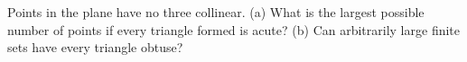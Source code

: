 Points in the plane have no three collinear. (a) What is the largest possible number of points if every triangle formed is acute? (b) Can arbitrarily large finite sets have every triangle obtuse?
